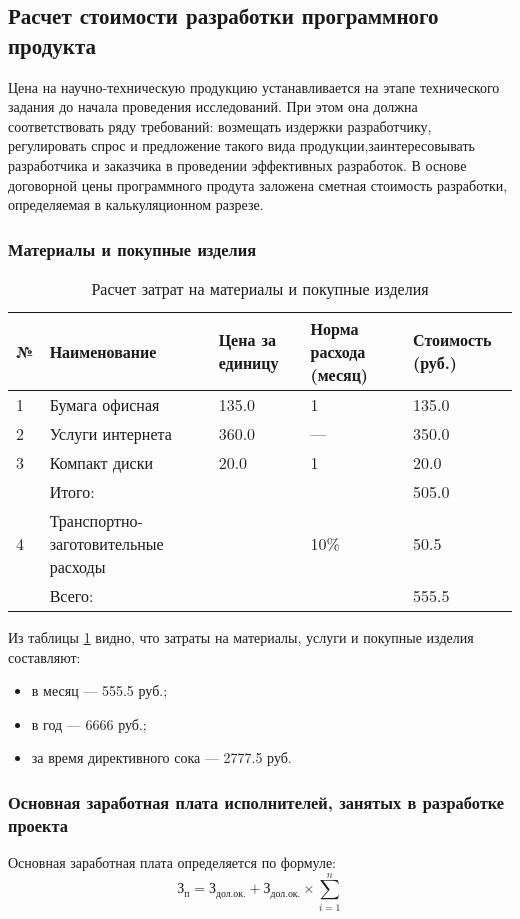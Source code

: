 \subsection{Расчет  стоимости  разработки программного продукта}
Цена на научно-техническую продукцию устанавливается на этапе технического задания
до начала проведения исследований.
При  этом она должна соответствовать ряду требований: возмещать  издержки разработчику,
регулировать спрос и предложение такого вида продукции,заинтересовывать
разработчика и заказчика в проведении эффективных разработок. В основе
договорной цены программного продута заложена  сметная  стоимость 
разработки, определяемая в калькуляционном разрезе.

\subsubsection{Материалы и покупные изделия}
\begin{table}[H]
\caption{Расчет затрат на материалы и покупные изделия}
\begin{tabular}{|p{1cm}|p{4cm}|p{3cm}|p{3cm}|p{4cm}|}
\hline{}
№ & Наименование & Цена за единицу& Норма расхода (месяц) & Стоимость (руб.) \\
\hline{}
1 & Бумага офисная & 135.0 & 1 & 135.0 \\
\hline{}
2 & Услуги интернета & 360.0 & --- & 350.0 \\
\hline{}
3 & Компакт диски & 20.0 & 1 & 20.0 \\
\hline{}
   & Итого:              &          &    & 505.0 \\
\hline{}
4 & Транспортно-заготовительные расходы & & 10\%  & 50.5 \\
\hline{}
  & Всего: & & &  555.5 \\
\hline
\end{tabular}
\label{table:meterials}
\end{table}
Из таблицы \ref{table:meterials} видно, что затраты на материалы, услуги и покупные изделия составляют:
\begin{itemize}
    \item{} в месяц --- 555.5 руб.;
    \item{} в год --- 6666 руб.;
    \item{} за время директивного сока --- 2777.5 руб.
\end{itemize}


\subsubsection{Основная заработная плата исполнителей, занятых в разработке проекта}
Основная заработная плата определяется по формуле:
\begin{equation}
	\textrm{З}_{\textrm{п}} = \textrm{З}_{\textrm{дол.ок.}} + \textrm{З}_{\textrm{дол.ок.}} \times{} \sum_{i=1}^n
\end{equation}

